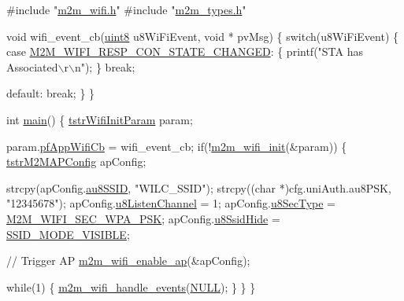 \begin{DoxyCode}
\textcolor{preprocessor}{#include "\hyperlink{m2m__wifi_8h}{m2m\_wifi.h}"}
\textcolor{preprocessor}{#include "\hyperlink{m2m__types_8h}{m2m\_types.h}"}

\textcolor{keywordtype}{void} wifi\_event\_cb(\hyperlink{group__DataT_ga4df709a77647e870bbf1d955b8edc9a6}{uint8} u8WiFiEvent, \textcolor{keywordtype}{void} * pvMsg)
\{
    \textcolor{keywordflow}{switch}(u8WiFiEvent)
    \{
        \textcolor{keywordflow}{case} \hyperlink{group__WlanEnums_gga064de09dec1d5e88ed8d075fa40f57deabb42b3025c56c51d915a1fa4abd2dbd0}{M2M\_WIFI\_RESP\_CON\_STATE\_CHANGED}:
        \{
            printf(\textcolor{stringliteral}{"STA has Associated\(\backslash\)r\(\backslash\)n"});
        \}
        \textcolor{keywordflow}{break};
        
        \textcolor{keywordflow}{default}:
        \textcolor{keywordflow}{break};
    \}
\}

\textcolor{keywordtype}{int} \hyperlink{demo_2microchip_2pic32mz__ef__curiosity_2wifi__http__server__demo_2src_2main_8c_ac5a1eca594b063e0d2dbccf86f96f221}{main}()
\{
    \hyperlink{structtstrWifiInitParam}{tstrWifiInitParam}   param;
    
    param.\hyperlink{group__WifiSetCustInfoElementFn_ga13d5fa7a0c71fd59bbf36a61923835cc}{pfAppWifiCb}   = wifi\_event\_cb;
    \textcolor{keywordflow}{if}(!\hyperlink{group__WifiInitFn_ga73c734812e844d96d860c4e93e9daf35}{m2m\_wifi\_init}(&param))
    \{
        \hyperlink{structtstrM2MAPConfig}{tstrM2MAPConfig}     apConfig;
        
        strcpy(apConfig.\hyperlink{structtstrM2MAPConfig_a880b8f6aff1114bfb6a6f94b9351920f}{au8SSID}, \textcolor{stringliteral}{"WILC\_SSID"});
        strcpy((\textcolor{keywordtype}{char} *)cfg.uniAuth.au8PSK, \textcolor{stringliteral}{"12345678"});
        apConfig.\hyperlink{structtstrM2MAPConfig_a1425d62e5001c25d04d88e20582526e0}{u8ListenChannel}    = 1;
        apConfig.\hyperlink{structtstrM2MAPConfig_a08ec2faca4058e8627cbfdb20f6a6da5}{u8SecType}          = \hyperlink{group__WlanEnums_ggaa232a09c953ec8200c13774f94107b05a951d0504fc8e173e60df8ee871f16697}{M2M\_WIFI\_SEC\_WPA\_PSK};
        apConfig.\hyperlink{structtstrM2MAPConfig_a425c035bc96435d3a9e75082ce27b569}{u8SsidHide}         = \hyperlink{group__WlanEnums_ggaa6553caf0dcdd1d8b908ec2383d86a60aec7509796a7b9fc2ecf2cb85d669f408}{SSID\_MODE\_VISIBLE};
                    
        \textcolor{comment}{// Trigger AP}
        \hyperlink{group__WifiEnableApFn_gab34cff419964df3c4e1ed86076aef7ce}{m2m\_wifi\_enable\_ap}(&apConfig);
        
        \textcolor{keywordflow}{while}(1)
        \{
            \hyperlink{group__WifiHandleEventsFn_ga461a4edc057cec8c00cf124a07aa3b02}{m2m\_wifi\_handle\_events}(\hyperlink{group__BSPDefine_ga070d2ce7b6bb7e5c05602aa8c308d0c4}{NULL});
        \}
    \}
\}
\end{DoxyCode}
 

